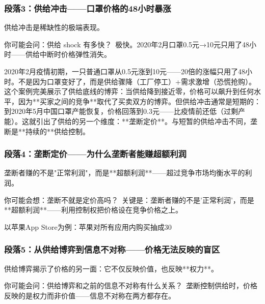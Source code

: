 \documentclass[openany, a4paper, 12pt]{book}
\begin{document}
	\subsubsection*{段落3：供给冲击——口罩价格的48小时暴涨}
	供给冲击是稀缺性的极端表现。
	\begin{tcolorbox}[colback=yellow!5, title=\textit{读者行为预测}]
		你可能会问：供给 shock 有多快？\ 极快。2020年2月口罩0.5元→10元只用了48小时——供给中断时价格弹性消失。
	\end{tcolorbox}

2020年2月疫情初期，一只普通口罩从0.5元涨到10元——20倍的涨幅只用了48小时。不是因为口罩变好了，而是供给骤降（工厂停工）+需求激增（恐慌抢购）。这个案例完美展示了供给底线的博弈：当供给降到接近零，价格可以飙升到任何水平，因为**买家之间的竞争**取代了买卖双方的博弈。但供给冲击通常是短期的：到2020年5月中国口罩产能恢复，价格回落到0.3元——比疫情前还低（过剩产能）。这就引出了供给的另一个维度：**垄断定价**。与短暂的供给冲击不同，垄断是**持续的**供给控制。

	\subsubsection*{段落4：垄断定价——为什么垄断者能赚超额利润}
	垄断者赚的不是"正常利润"，而是**超额利润**——超过竞争市场均衡水平的利润。
	\begin{tcolorbox}[colback=yellow!5, title=\textit{读者行为预测}]
		你可能会想：垄断不就是定价高吗？\ 关键是：垄断者赚的不是'正常利润'，而是**超额利润**——利用控制权把价格设在竞争价格之上。
	\end{tcolorbox}

以苹果App Store为例：苹果对所有应用内购买抽成30%

	\subsubsection*{段落5：从供给博弈到信息不对称——价格无法反映的盲区}
	供给博弈揭示了价格的另一面：它不仅反映价值，也反映**权力**。
	\begin{tcolorbox}[colback=yellow!5, title=\textit{读者行为预测}]
		你可能会问：供给博弈和之前的信息不对称有什么关系？\ 垄断控制供给时，价格反映的是权力而非价值——信息不对称在两方都存在。
	\end{tcolorbox}
\end{document}
